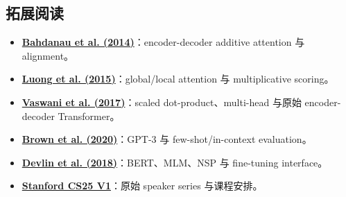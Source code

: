 \subsection{拓展阅读}

{\small
\begin{itemize}[nosep,leftmargin=*]
  \item \href{https://arxiv.org/abs/1409.0473}{\textbf{Bahdanau et al. (2014)}}：encoder-decoder additive attention 与 alignment。
  \item \href{https://arxiv.org/abs/1508.04025}{\textbf{Luong et al. (2015)}}：global/local attention 与 multiplicative scoring。
  \item \href{https://arxiv.org/abs/1706.03762}{\textbf{Vaswani et al. (2017)}}：scaled dot-product、multi-head 与原始 encoder-decoder Transformer。
  \item \href{https://arxiv.org/abs/2005.14165}{\textbf{Brown et al. (2020)}}：GPT-3 与 few-shot/in-context evaluation。
  \item \href{https://arxiv.org/abs/1810.04805}{\textbf{Devlin et al. (2018)}}：BERT、MLM、NSP 与 fine-tuning interface。
  \item \href{https://web.stanford.edu/class/cs25/past/cs25-v1/}{\textbf{Stanford CS25 V1}}：原始 speaker series 与课程安排。
\end{itemize}
}


